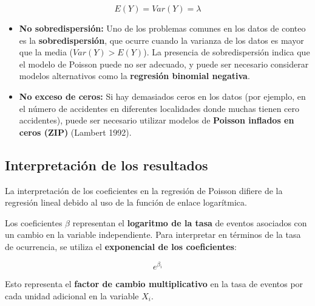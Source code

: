 \documentclass[
  letterpaper,
  DIV=11,
  numbers=noendperiod]{scrreprt}
\begin{document}
\[
   E(Y) = Var(Y) = \lambda
   \]

\begin{itemize}
\item
  \textbf{No sobredispersión:} Uno de los problemas comunes en los datos
  de conteo es la \textbf{sobredispersión}, que ocurre cuando la
  varianza de los datos es mayor que la media (\(Var(Y) > E(Y)\)). La
  presencia de sobredispersión indica que el modelo de Poisson puede no
  ser adecuado, y puede ser necesario considerar modelos alternativos
  como la \textbf{regresión binomial negativa}.
\item
  \textbf{No exceso de ceros:} Si hay demasiados ceros en los datos (por
  ejemplo, en el número de accidentes en diferentes localidades donde
  muchas tienen cero accidentes), puede ser necesario utilizar modelos
  de \textbf{Poisson inflados en ceros (ZIP)} (Lambert 1992).
\end{itemize}

\subsection{Interpretación de los
resultados}\label{interpretaciuxf3n-de-los-resultados}

La interpretación de los coeficientes en la regresión de Poisson difiere
de la regresión lineal debido al uso de la función de enlace
logarítmica.

Los coeficientes \(\beta\) representan el \textbf{logaritmo de la tasa}
de eventos asociados con un cambio en la variable independiente. Para
interpretar en términos de la tasa de ocurrencia, se utiliza el
\textbf{exponencial de los coeficientes}:

\[
  e^{\beta_i}
\]

Esto representa el \textbf{factor de cambio multiplicativo} en la tasa
de eventos por cada unidad adicional en la variable \(X_i\).
\end{document}
